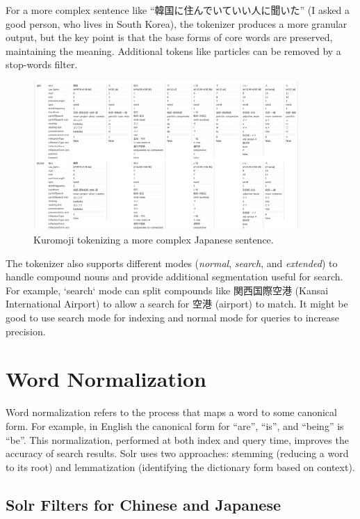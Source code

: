 \documentclass[11pt]{article}
\begin{document}
For a more complex sentence like “韓国に住んでいていい人に聞いた” (I asked a good person, who lives in South Korea), the tokenizer produces a more granular output, but the key point is that the base forms of core words are preserved, maintaining the meaning. Additional tokens like particles can be removed by a stop-words filter.

\begin{figure}[h!]
    \centering
    \includegraphics[width=0.9\textwidth]{image6.png}
    \caption{Kuromoji tokenizing a more complex Japanese sentence.}
    \label{fig:kuromoji_example2}
\end{figure}

The tokenizer also supports different modes (\textit{normal}, \textit{search}, and \textit{extended}) to handle compound nouns and provide additional segmentation useful for search. For example, `search` mode can split compounds like 関西国際空港 (Kansai International Airport) to allow a search for 空港 (airport) to match. It might be good to use search mode for indexing and normal mode for queries to increase precision.

\section{Word Normalization}
Word normalization refers to the process that maps a word to some canonical form. For example, in English the canonical form for “are”, “is”, and “being” is “be”. This normalization, performed at both index and query time, improves the accuracy of search results. Solr uses two approaches: stemming (reducing a word to its root) and lemmatization (identifying the dictionary form based on context).

\subsection{Solr Filters for Chinese and Japanese}
\end{document}
